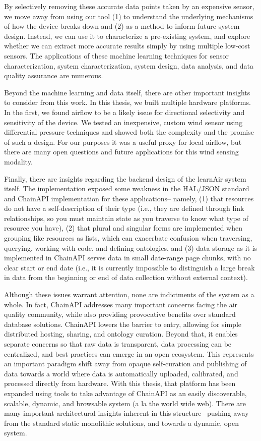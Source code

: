 By selectively removing these accurate data points taken by an expensive sensor, we move away from using our tool (1) to understand the underlying mechanisms of how the device breaks down and (2) as a method to inform future system design.  Instead, we can use it to characterize a pre-existing system, and explore whether we can extract more accurate results simply by using multiple low-cost sensors.  The applications of these machine learning techniques for sensor characterization, system characterization, system design, data analysis, and data quality assurance are numerous.

Beyond the machine learning and data itself, there are other important insights to consider from this work.  In this thesis, we built multiple hardware platforms.  In the first, we found airflow to be a likely issue for directional selectivity and sensitivity of the device.  We tested an inexpensive, custom wind sensor using differential pressure techniques and showed both the complexity and the promise of such a design.  For our purposes it was a useful proxy for local airflow, but there are many open questions and future applications for this wind sensing modality.   

Finally, there are insights regarding the backend design of the learnAir system itself.  The implementation exposed some weakness in the HAL/JSON standard and ChainAPI implementation for these applications-- namely, (1) that resources do not have a self-description of their type (i.e., they are defined through link relationships, so you must maintain state as you traverse to know what type of resource you have), (2) that plural and singular forms are implemented when grouping like resources as lists, which can exacerbate confusion when traversing, querying, working with code, and defining ontologies, and (3) data storage as it is implemented in ChainAPI serves data in small date-range page chunks, with no clear start or end date (i.e., it is currently impossible to distinguish a large break in data from the beginning or end of data collection without external context).  

Although these issues warrant attention, none are indictments of the system as a whole. In fact, ChainAPI addresses many important concerns facing the air quality community, while also providing provocative benefits over standard database solutions.  ChainAPI lowers the barrier to entry, allowing for simple distributed hosting, sharing, and ontology curation.  Beyond that, it enables separate concerns so that raw data is transparent, data processing can be centralized, and best practices can emerge in an open ecosystem.  This represents an important paradigm shift away from opaque self-curation and publishing of data towards a world where data is automatically uploaded, calibrated, and processed directly from hardware.  With this thesis, that platform has been expanded using tools to take advantage of ChainAPI as an easily discoverable, scalable, dynamic, and browsable system (a la the world wide web).  There are many important architectural insights inherent in this structure-- pushing away from the standard static monolithic solutions, and towards a dynamic, open system. 


